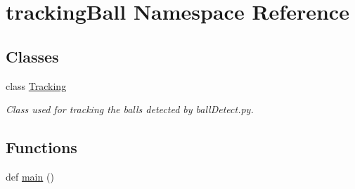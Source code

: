 \hypertarget{namespacetrackingBall}{}\section{tracking\+Ball Namespace Reference}
\label{namespacetrackingBall}
\subsection*{Classes}
\begin{DoxyCompactItemize}
\item 
class \hyperlink{classtrackingBall_1_1Tracking}{Tracking}
\begin{DoxyCompactList}\small\item\em Class used for tracking the balls detected by ball\+Detect.\+py. \end{DoxyCompactList}\end{DoxyCompactItemize}
\subsection*{Functions}
\begin{DoxyCompactItemize}
\item 
def \hyperlink{namespacetrackingBall_a598e946cfc8046154c148b5a4cc59c85}{main} ()
\end{DoxyCompactItemize}
